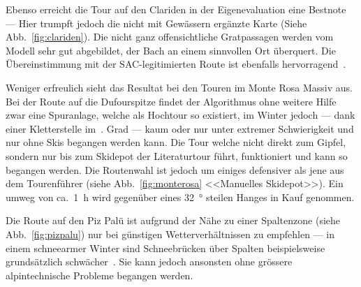Ebenso erreicht die Tour auf den Clariden in der Eigenevaluation eine Bestnote --- Hier trumpft jedoch die nicht mit Gewässern ergänzte Karte (Siehe Abb.\ \ref{fig:clariden}). Die nicht ganz offensichtliche Gratpassagen werden vom Modell sehr gut abgebildet, der Bach an einem sinnvollen Ort überquert. Die Übereinstimmung mit der SAC-legitimierten Route ist ebenfalls hervorragend~\cite{twslstgallappzll}.

Weniger erfreulich sieht das Resultat bei den Touren im Monte Rosa Massiv aus. Bei der Route auf die Dufourspitze findet der Algorithmus ohne weitere Hilfe zwar eine Spuranlage, welche als Hochtour so existiert, im Winter jedoch --- dank einer Kletterstelle im~. Grad --- kaum oder nur unter extremer Schwierigkeit und nur ohne Skis begangen werden kann. 
Die Tour welche nicht direkt zum Gipfel, sondern nur bis zum Skidepot der Literaturtour führt, funktioniert und kann so begangen werden. Die Routenwahl ist jedoch um einiges defensiver als jene aus dem Tourenführer (siehe Abb.\ \ref{fig:monterosa} <<Manuelles Skidepot>>). Ein umweg von ca.\ \qty{1}{h} wird gegenüber eines \qty{32}{°} steilen Hanges in Kauf genommen.

Die Route auf den Piz Palü ist aufgrund der Nähe zu einer Spaltenzone (siehe Abb.\ \ref{fig:pizpalu}) nur bei günstigen Wetterverhältnissen zu empfehlen --- in einem schneearmer Winter sind Schneebrücken über Spalten beispielsweise grundsätzlich schwächer~\cite{bergsteigenErhhtesRisiko}. Sie kann jedoch ansonsten ohne grössere alpintechnische Probleme begangen werden.

